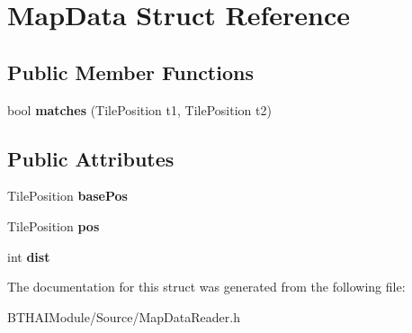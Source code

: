 \hypertarget{struct_map_data}{\section{Map\-Data Struct Reference}
\label{struct_map_data}
}
\subsection*{Public Member Functions}
\begin{DoxyCompactItemize}
\item 
\hypertarget{struct_map_data_a708293e6b8ad39c01bee5fcfe191f992}{bool {\bfseries matches} (Tile\-Position t1, Tile\-Position t2)}\label{struct_map_data_a708293e6b8ad39c01bee5fcfe191f992}

\end{DoxyCompactItemize}
\subsection*{Public Attributes}
\begin{DoxyCompactItemize}
\item 
\hypertarget{struct_map_data_a05ff052635174060ff62ea1e904f74ba}{Tile\-Position {\bfseries base\-Pos}}\label{struct_map_data_a05ff052635174060ff62ea1e904f74ba}

\item 
\hypertarget{struct_map_data_ac18aeb48b443dd28a8e085faa66b999c}{Tile\-Position {\bfseries pos}}\label{struct_map_data_ac18aeb48b443dd28a8e085faa66b999c}

\item 
\hypertarget{struct_map_data_a7729791b2cf88381d9d34e5cb240f28a}{int {\bfseries dist}}\label{struct_map_data_a7729791b2cf88381d9d34e5cb240f28a}

\end{DoxyCompactItemize}


The documentation for this struct was generated from the following file\-:\begin{DoxyCompactItemize}
\item 
B\-T\-H\-A\-I\-Module/\-Source/Map\-Data\-Reader.\-h\end{DoxyCompactItemize}
